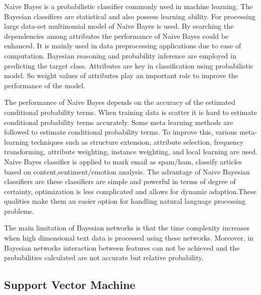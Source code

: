 Naive Bayes is a probabilistic classifier commonly used in machine learning. The Bayesian classifiers are statistical and also possess learning ability. For processing large data-set multinomial model of Naive Bayes is used. By searching the dependencies among attributes the performance of Naive Bayes could be enhanced. It is mainly used in data preprocessing applications due to ease of computation. Bayesian reasoning and probability inference are employed in predicting the target class. Attributes are key in classification using probabilistic model. So weight values of attributes play an important role to improve the performance of the model. %
\par
\vspace{0.5cm}
The performance of Naive Bayes depends on the accuracy of the estimated conditional probability terms. When training data is scatter it is hard to estimate conditional probability terms accurately. Some meta learning methods are followed to estimate conditional probability terms. To improve this, various meta-learning techniques such as structure extension, attribute selection, frequency transforming, attribute weighting, instance weighting, and local learning are used. Naive Bayes classifier is applied to mark email as spam/ham, classify articles based on content,sentiment/emotion analysis.%
The advantage of Naive Bayesian classifiers are these classifiers are simple and  powerful in terms of degree of certainty, optimization is less complicated and allows for dynamic adaption.These qualities  make them an easier option for handling natural language processing problems. \par
\vspace{.5cm}
The main limitation of Bayesian networks is that the time complexity increases when high dimensional text data is processed using these networks. Moreover, in Bayesian networks interaction between features can not be achieved and the probabilities calculated are not accurate but relative probability.

\subsection{Support Vector Machine}